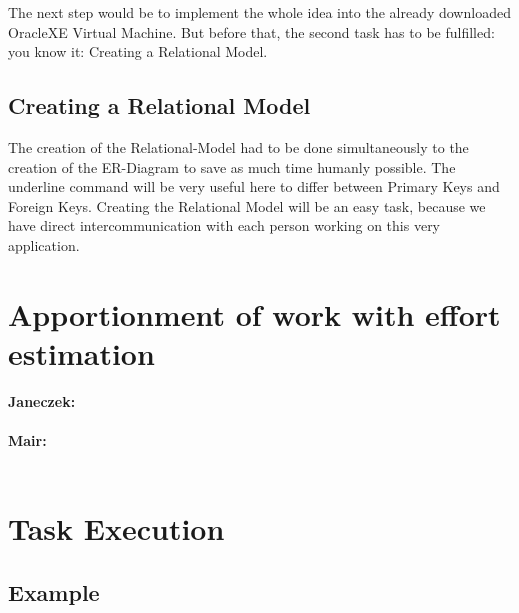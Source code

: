 \documentclass[11pt,a4paper]{article}
\begin{document}
 \noindent The next step would be to implement the whole idea into the already downloaded OracleXE Virtual Machine. But before that, the second task has to be fulfilled: you know it: Creating a Relational Model.
\subsection{Creating a Relational Model}
The creation of the Relational-Model had to be done simultaneously to the creation of the ER-Diagram to save as much time humanly possible. The underline command will be very useful here to differ between Primary Keys and Foreign Keys. Creating the Relational Model will be an easy task, because we have direct intercommunication with each person working on this very application.

\newpage
\section{Apportionment of work with effort estimation}

\textbf{Janeczek:} \\ \\
\textbf{Mair:} \\ \\

\newpage
\section{Task Execution}
\subsection{Example}

\newpage
\end{document}
